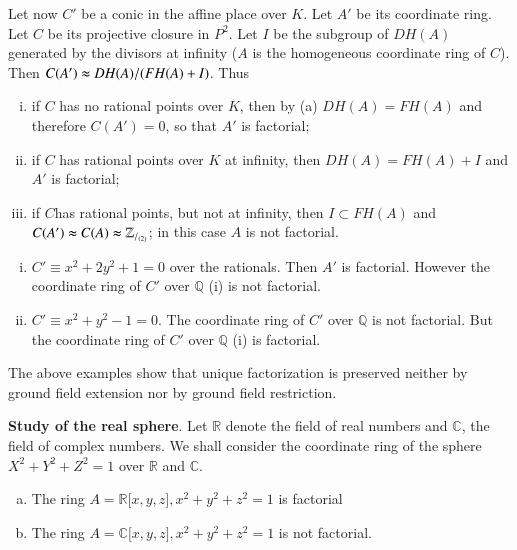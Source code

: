   Let now $C'$ be a conic in the affine place over $K$. Let $A'$ be
  its coordinate ring. Let $C$ be its projective closure in $P^2$. Let
  $I$ be the subgroup of $D H(A)$ generated by the divisors at
  infinity ($A$ is the homogeneous coordinate ring of $C$). Then
  $C(A') \thickapprox D H (A)/ (FH(A) + I)$. Thus 
\begin{enumerate}[(i)]
\item if $C$ has no rational points over $K$, then by (a) $D H (A) = F
  H(A)$ and therefore $C(A') = 0$, so that $A'$ is factorial;
 
\item if $C$ has rational points over $K$ at infinity, then $DH(A) =
  FH(A) + I$ and $A'$ is factorial; 

\item if $C$\pageoriginale has rational points, but not at infinity,
  then $I \subset FH (A)$ and $C(A') \thickapprox C(A) \thickapprox 
  \mathbb{Z}_{/_{(2)}}$; in this case $A$ is not factorial. 
  \end{enumerate}
  
\begin{examples*} %
\begin{enumerate} [(i)]
\item $C' \equiv x^2 + 2y^2 + 1 =0$ over the rationals. Then $A'$ is
  factorial. However the coordinate ring of $C'$ over $\mathbb{Q}$ (i) is not
  factorial. 

\item $C' \equiv x^2 + y^2 - 1 = 0$. The coordinate ring of $C'$ over
  $\mathbb{Q}$ is not factorial. But the coordinate ring of $C'$ over
  $\mathbb{Q}$ (i) is factorial. 
\end{enumerate}
    \end{examples*}
    
    The above examples show that unique factorization is preserved
    neither by ground field extension nor by ground field
    restriction. 
    
\medskip
\noindent\textbf{Study of the real sphere}. Let $\mathbb{R}$ denote 
         the field of real numbers and $\mathbb{C}$, the field of
         complex numbers. We shall consider the coordinate ring of the
         sphere $X^2+Y^2+Z^2 = 1$ over $\mathbb{R}$ and $\mathbb{C}$.     

\setcounter{prop}{2}
\begin{prop} %
\begin{enumerate}[(a)]
\item The ring $A = \mathbb{R} \big[ x, y, z \big], x^2 + y^2 +
  z^2 = 1$ is factorial 
 
\item The ring $A = \mathbb{C} \big[x, y, z \big], x^2+y^2+z^2 =
  1$ is not factorial. 
\end{enumerate}
\end{prop}

